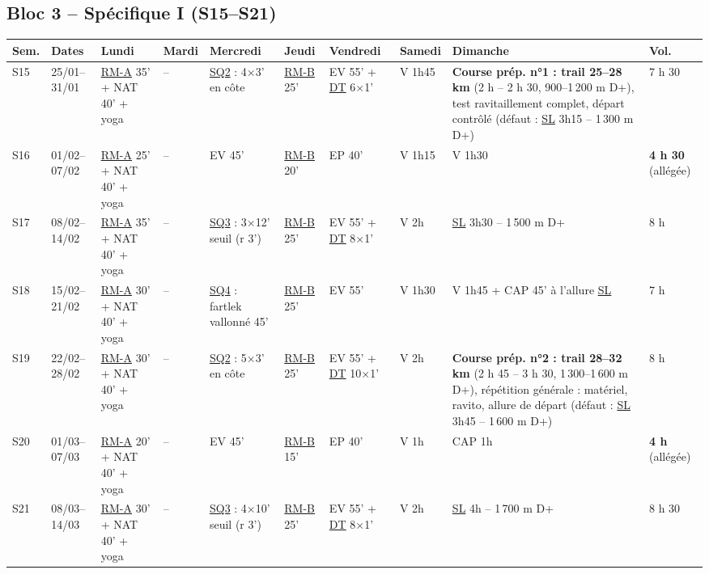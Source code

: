 \documentclass[10pt,a4paper]{article}
\newcommand{\rma}{\hyperlink{rm-a}{RM-A}}
\newcommand{\rmb}{\hyperlink{rm-b}{RM-B}}
\newcommand{\sqb}{\hyperlink{sq2}{SQ2}}
\newcommand{\sqc}{\hyperlink{sq3}{SQ3}}
\newcommand{\sqd}{\hyperlink{sq4}{SQ4}}
\newcommand{\dtl}{\hyperlink{dt}{DT}}
\newcommand{\sln}{\hyperlink{legende}{SL}}
\begin{document}
\begin{landscape}
\subsection*{\color{acc} Bloc 3 -- Sp\'ecifique I (S15--S21)}
\begin{tabular}{p{0.95cm}p{1.5cm}p{2.95cm}p{1.3cm}p{3.7cm}p{1.5cm}p{3.5cm}p{2.2cm}p{3.9cm}p{1.15cm}}
\toprule
\textbf{Sem.} & \textbf{Dates} & \textbf{Lundi} & \textbf{Mardi} & \textbf{Mercredi} & \textbf{Jeudi} & \textbf{Vendredi} & \textbf{Samedi} & \textbf{Dimanche} & \textbf{Vol.}\\
\midrule
S15 & 25/01--31/01 & \rma{} 35' + NAT 40' + yoga & -- & \sqb{} : 4$\times$3' en c\^ote & \rmb{} 25' & EV 55' + \dtl{} 6$\times$1' & V 1h45 & \textbf{Course pr\'ep. n°1 : trail 25--28 km} (2 h -- 2 h 30, 900--1\,200 m D+), test ravitaillement complet, d\'epart contr\^ol\'e (d\'efaut : \sln{} 3h15 -- 1\,300 m D+) & 7 h 30\\
S16 & 01/02--07/02 & \rma{} 25' + NAT 40' + yoga & -- & EV 45' & \rmb{} 20' & EP 40' & V 1h15 & V 1h30 & \textbf{4 h 30} (all\'eg\'ee)\\
S17 & 08/02--14/02 & \rma{} 35' + NAT 40' + yoga & -- & \sqc{} : 3$\times$12' seuil (r 3') & \rmb{} 25' & EV 55' + \dtl{} 8$\times$1' & V 2h & \sln{} 3h30 -- 1\,500 m D+ & 8 h\\
S18 & 15/02--21/02 & \rma{} 30' + NAT 40' + yoga & -- & \sqd{} : fartlek vallonn\'e 45' & \rmb{} 25' & EV 55' & V 1h30 & V 1h45 + CAP 45' \`a l'allure \sln{} & 7 h\\
S19 & 22/02--28/02 & \rma{} 30' + NAT 40' + yoga & -- & \sqb{} : 5$\times$3' en c\^ote & \rmb{} 25' & EV 55' + \dtl{} 10$\times$1' & V 2h & \textbf{Course pr\'ep. n°2 : trail 28--32 km} (2 h 45 -- 3 h 30, 1\,300--1\,600 m D+), r\'ep\'etition g\'en\'erale : mat\'eriel, ravito, allure de d\'epart (d\'efaut : \sln{} 3h45 -- 1\,600 m D+) & 8 h\\
S20 & 01/03--07/03 & \rma{} 20' + NAT 40' + yoga & -- & EV 45' & \rmb{} 15' & EP 40' & V 1h & CAP 1h & \textbf{4 h} (all\'eg\'ee)\\
S21 & 08/03--14/03 & \rma{} 30' + NAT 40' + yoga & -- & \sqc{} : 4$\times$10' seuil (r 3') & \rmb{} 25' & EV 55' + \dtl{} 8$\times$1' & V 2h & \sln{} 4h -- 1\,700 m D+ & 8 h 30\\
\bottomrule
\end{tabular}
\medskip


\end{landscape}
\end{document}
